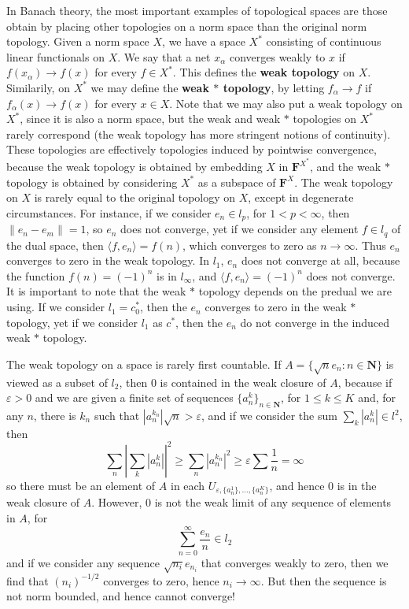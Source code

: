 \begin{example}
    In Banach theory, the most important examples of topological spaces are those obtain by placing other topologies on a norm space than the original norm topology. Given a norm space $X$, we have a space $X^*$ consisting of continuous linear functionals on $X$. We say that a net $x_\alpha$ converges weakly to $x$ if $f(x_\alpha) \to f(x)$ for every $f \in X^*$. This defines the {\bf weak topology} on $X$. Similarily, on $X^*$ we may define the {\bf weak $*$ topology}, by letting $f_\alpha \to f$ if $f_\alpha(x) \to f(x)$ for every $x \in X$. Note that we may also put a weak topology on $X^*$, since it is also a norm space, but the weak and weak $*$ topologies on $X^*$ rarely correspond (the weak topology has more stringent notions of continuity). These topologies are effectively topologies induced by pointwise convergence, because the weak topology is obtained by embedding $X$ in $\mathbf{F}^{X^*}$, and the weak $*$ topology is obtained by considering $X^*$ as a subspace of $\mathbf{F}^X$. The weak topology on $X$ is rarely equal to the original topology on $X$, except in degenerate circumstances. For instance, if we consider $e_n \in l_p$, for $1 < p < \infty$, then $\| e_n - e_m \| = 1$, so $e_n$ does not converge, yet if we consider any element $f \in l_q$ of the dual space, then $\langle f, e_n \rangle = f(n)$, which converges to zero as $n \to \infty$. Thus $e_n$ converges to zero in the weak topology. In $l_1$, $e_n$ does not converge at all, because the function $f(n) = (-1)^n$ is in $l_\infty$, and $\langle f, e_n \rangle = (-1)^n$ does not converge. It is important to note that the weak $*$ topology depends on the predual we are using. If we consider $l_1 = c_0^*$, then the $e_n$ converges to zero in the weak $*$ topology, yet if we consider $l_1$ as $c^*$, then the $e_n$ do not converge in the induced weak $*$ topology.

    The weak topology on a space is rarely first countable. If $A = \{ \sqrt{n} e_n : n \in \mathbf{N} \}$ is viewed as a subset of $l_2$, then 0 is contained in the weak closure of $A$, because if $\varepsilon > 0$ and we are given a finite set of sequences $\{ a_n^k \}_{n \in \mathbf{N}}$, for $1 \leq k \leq K$ and, for any $n$, there is $k_n$ such that $|a_n^{k_n}| \sqrt{n} > \varepsilon$, and if we consider the sum $\sum_k |a_n^k| \in l^2$, then
    \[ \sum_n \left|\sum_k |a_n^k| \right|^2 \geq \sum_n |a_n^{k_n}|^2 \geq \varepsilon \sum \frac{1}{n} = \infty \]
    so there must be an element of $A$ in each $U_{\varepsilon, \{ a_n^1 \}, \dots, \{ a_n^K \}}$, and hence $0$ is in the weak closure of $A$. However, 0 is not the weak limit of any sequence of elements in $A$, for
    \[ \sum_{n = 0}^\infty \frac{e_n}{n} \in l_2 \]
    and if we consider any sequence $\sqrt{n_i} e_{n_i}$ that converges weakly to zero, then we find that $(n_i)^{-1/2}$ converges to zero, hence $n_i \to \infty$. But then the sequence is not norm bounded, and hence cannot converge!
\end{example}

